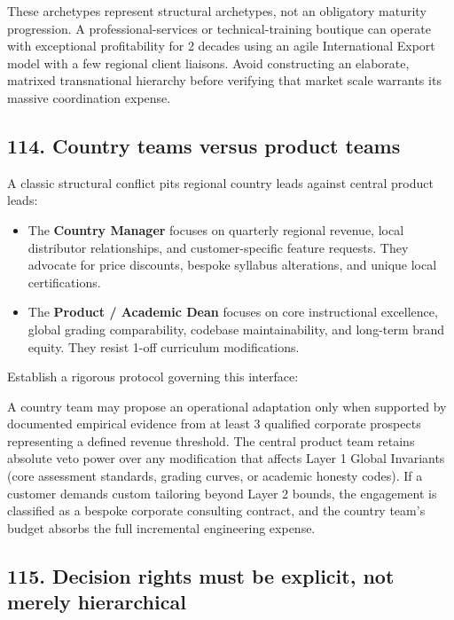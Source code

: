 These archetypes represent structural archetypes, not an obligatory maturity progression. A professional-services or technical-training boutique can operate with exceptional profitability for 2 decades using an agile International Export model with a few regional client liaisons. Avoid constructing an elaborate, matrixed transnational hierarchy before verifying that market scale warrants its massive coordination expense.

\subsection{114. Country teams versus product teams}

A classic structural conflict pits regional country leads against central product leads:
\begin{itemize}
    \item The \textbf{Country Manager} focuses on quarterly regional revenue, local distributor relationships, and customer-specific feature requests. They advocate for price discounts, bespoke syllabus alterations, and unique local certifications.
    \item The \textbf{Product / Academic Dean} focuses on core instructional excellence, global grading comparability, codebase maintainability, and long-term brand equity. They resist 1-off curriculum modifications.
\end{itemize}

Establish a rigorous protocol governing this interface:
\begin{tcolorbox}[colback=BayesCanvas,colframe=BayesSecondary,arc=1mm,title=\textbf{The Product-Country Governance Interface}]
A country team may propose an operational adaptation only when supported by documented empirical evidence from at least 3 qualified corporate prospects representing a defined revenue threshold. The central product team retains absolute veto power over any modification that affects Layer 1 Global Invariants (core assessment standards, grading curves, or academic honesty codes). If a customer demands custom tailoring beyond Layer 2 bounds, the engagement is classified as a bespoke corporate consulting contract, and the country team's budget absorbs the full incremental engineering expense.
\end{tcolorbox}

\subsection{115. Decision rights must be explicit, not merely hierarchical}

